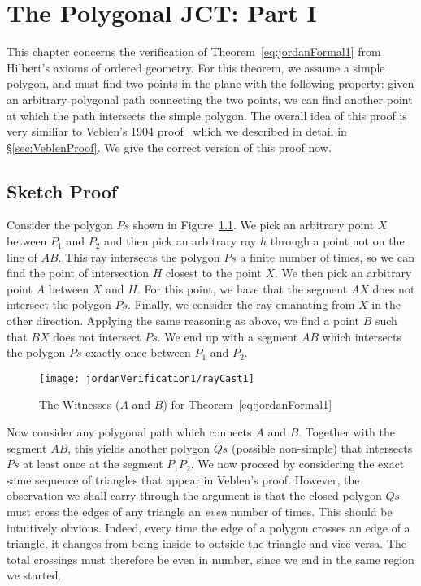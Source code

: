 \chapter{The Polygonal JCT: Part I}\label{chapter:JordanFormalisation}\label{chapter:JordanVerification1}
This chapter concerns the verification of Theorem~\ref{eq:jordanFormal1} from Hilbert's axioms of ordered geometry. For this theorem, we assume a simple polygon, and must find two points in the plane with the following property: given an arbitrary polygonal path connecting the two points, we can find another point at which the path intersects the simple polygon. The overall idea of this proof is very similiar to Veblen's 1904 proof~\cite{Veblenphd} which we described in detail in \S\ref{sec:VeblenProof}. We give the correct version of this proof now.

\section{Sketch Proof}\label{sec:ParityProofInformal}
Consider the polygon $Ps$ shown in Figure~\ref{fig:rayCast1}. We pick an arbitrary point $X$ between $P_1$ and $P_2$  and then pick an arbitrary ray $h$ through a point not on the line of $AB$. This ray intersects the polygon $Ps$ a finite number of times, so we can find the point of intersection $H$ closest to the point $X$. We then pick an arbitrary point $A$ between $X$ and $H$. For this point, we have that the segment $AX$ does not intersect the polygon $Ps$. Finally, we consider the ray emanating from $X$ in the other direction. Applying the same reasoning as above, we find a point $B$ such that $BX$ does not intersect $Ps$. We end up with a segment $AB$ which intersects the polygon $Ps$ exactly once between $P_1$ and $P_2$.

\begin{figure}
\centering\texttt{[image: jordanVerification1/rayCast1]}
\caption{The Witnesses ($A$ and $B$) for Theorem~\ref{eq:jordanFormal1}}
\label{fig:rayCast1}
\end{figure}

\newcommand{\insideoutsideclaim}{every time the edge of a polygon crosses an edge of a triangle, it changes from being inside to outside the triangle and vice-versa}

Now consider any polygonal path which connects $A$ and $B$. Together with the segment $AB$, this yields another polygon $Qs$ (possible non-simple) that intersects $Ps$ at least once at the segment $P_1P_2$. We now proceed by considering the exact same sequence of triangles that appear in Veblen's proof. However, the observation we shall carry through the argument is that the closed polygon $Qs$ must cross the edges of any triangle an \emph{even} number of times. This should be intuitively obvious. Indeed, \insideoutsideclaim. The total crossings must therefore be even in number, since we end in the same region we started.

